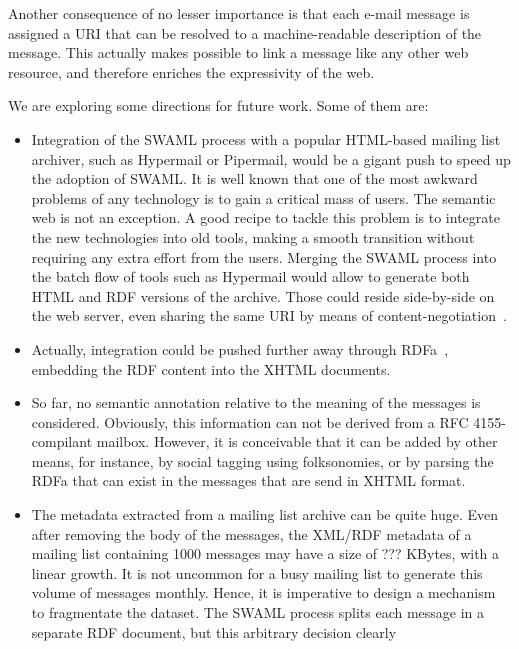 \documentclass{llncs}
\begin{document}
Another consequence of no lesser importance is that each e-mail message
is assigned a URI that can be resolved to a machine-readable description
of the message. This actually makes possible to link a message like
any other web resource, and therefore enriches the expressivity of the
web.

We are exploring some directions for future work. Some of them are:

\begin{itemize}
  \item Integration of the SWAML process with a popular HTML-based
        mailing list archiver, such as Hypermail or Pipermail, would be
        a gigant push to speed up the adoption of SWAML. It is well
        known that one of the most awkward problems of any technology
        is to gain a critical mass of users. The semantic web is not
        an exception. A good recipe to tackle this problem is to
        integrate the new technologies into old tools, making
        a smooth transition without requiring any extra effort from
        the users. Merging the SWAML process into the batch flow of
        tools such as Hypermail would allow to generate both
        HTML and RDF versions of the archive. Those could reside
        side-by-side on the web server, even sharing the same URI
        by means of content-negotiation~\cite{Recipes}.
  \item Actually, integration could be pushed further away through
        RDFa~\cite{Birbeck2006}, embedding the RDF content into the
        XHTML documents.
  \item So far, no semantic annotation relative to the meaning of
        the messages is considered. Obviously, this information can not
        be derived from a RFC 4155-compilant mailbox. However, it is
        conceivable that it can be added by other means, for instance,
        by social tagging using folksonomies, or by parsing the RDFa
        that can exist in the messages that are send in XHTML format.
  \item The metadata extracted from a mailing list archive can be
        quite huge. Even after removing the body of the messages, the
        XML/RDF metadata of a mailing list containing 1000 messages may
        have a size of ??? KBytes, with a linear growth. It is not uncommon
        for a busy mailing list to generate this volume of messages
        monthly. Hence, it is imperative to design a mechanism to
        fragmentate the dataset. The SWAML process splits each message
        in a separate RDF document, but this arbitrary decision clearly

\end{itemize}
\end{document}
